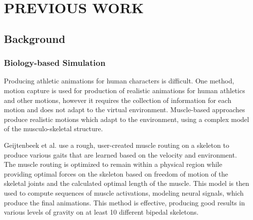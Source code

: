 
 
\chapter{PREVIOUS WORK}
\label{chapter:previous_work}

\section{Background}
\subsection{Biology-based Simulation}
Producing athletic animations for human characters is difficult.  One method, motion capture is used for production of realistic animations for human athletics and other motions, however it requires the collection of information for each motion and does not adapt to the virtual environment.  Muscle-based approaches produce realistic motions which adapt to the environment, using a complex model of the musculo-skeletal structure.  

Geijtenbeek et al.\cite{muscle_based_bipeds} use a rough, user-created muscle routing on a skeleton to produce various gaits that are learned based on the velocity and environment.  The muscle routing is optimized to remain within a physical region while providing optimal forces on the skeleton based on freedom of motion of the skeletal joints and the calculated optimal length of the muscle.  This model is then used to compute sequences of muscle activations, modeling neural signals, which produce the final animations.  This method is effective, producing good results in various levels of gravity on at least 10 different bipedal skeletons.

		

